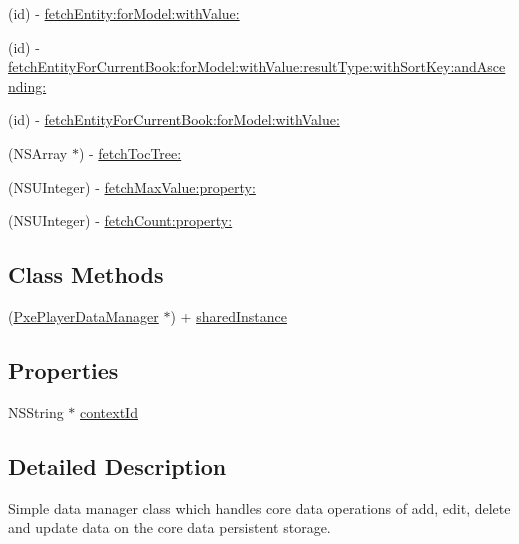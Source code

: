 \begin{DoxyCompactItemize}
\item 
(id) -\/ \hyperlink{interface_pxe_player_data_manager_a9cfaceea7070edda30cd674ae89ac479}{fetch\-Entity\-:for\-Model\-:with\-Value\-:}
\item 
(id) -\/ \hyperlink{interface_pxe_player_data_manager_a287665eadcaa56862dbff0c8f4b80306}{fetch\-Entity\-For\-Current\-Book\-:for\-Model\-:with\-Value\-:result\-Type\-:with\-Sort\-Key\-:and\-Ascending\-:}
\item 
(id) -\/ \hyperlink{interface_pxe_player_data_manager_a57e9fba86112c53f947c3966df1db23f}{fetch\-Entity\-For\-Current\-Book\-:for\-Model\-:with\-Value\-:}
\item 
(N\-S\-Array $\ast$) -\/ \hyperlink{interface_pxe_player_data_manager_a1489b7de9d4bca3c97b774da1b82aaf2}{fetch\-Toc\-Tree\-:}
\item 
(N\-S\-U\-Integer) -\/ \hyperlink{interface_pxe_player_data_manager_a777a3d39dc97a339ffd84be5c7cc2a4e}{fetch\-Max\-Value\-:property\-:}
\item 
(N\-S\-U\-Integer) -\/ \hyperlink{interface_pxe_player_data_manager_a47c6c2ec52346caf5a0d7fc8711703dc}{fetch\-Count\-:property\-:}
\end{DoxyCompactItemize}
\subsection*{Class Methods}
\begin{DoxyCompactItemize}
\item 
(\hyperlink{interface_pxe_player_data_manager}{Pxe\-Player\-Data\-Manager} $\ast$) + \hyperlink{interface_pxe_player_data_manager_a61a323a6162afc1a8734d8a1f7cc89c6}{shared\-Instance}
\end{DoxyCompactItemize}
\subsection*{Properties}
\begin{DoxyCompactItemize}
\item 
N\-S\-String $\ast$ \hyperlink{interface_pxe_player_data_manager_a09ec53de035d5a7a96604fa92eaab758}{context\-Id}
\end{DoxyCompactItemize}


\subsection{Detailed Description}
Simple data manager class which handles core data operations of add, edit, delete and update data on the core data persistent storage. 

